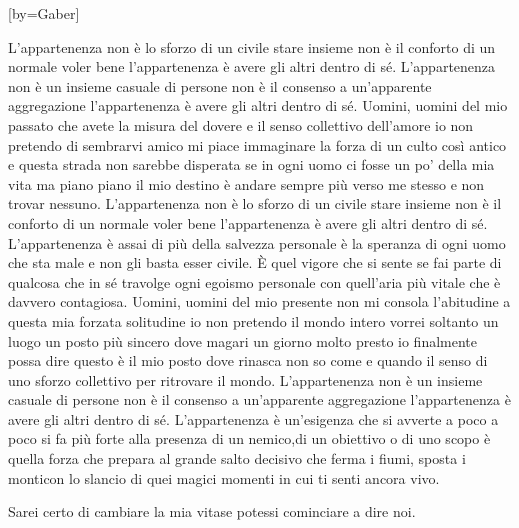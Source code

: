 [by={Gaber}]
\chordsoff
\beginverse*
\rule{0pt}{13pt}L'appartenenza non è lo sforzo \brk di un civile stare insieme
non è il conforto di un normale voler bene
l'appartenenza è avere gli altri dentro di sé.
\endverse
\beginverse*
L'appartenenza \brk  non è un insieme casuale di persone
non è il consenso a un'apparente aggregazione
l'appartenenza è avere gli altri dentro di sé.
\endverse
\beginverse*
Uomini, uomini del mio passato
che avete la misura del dovere
e il senso collettivo dell'amore
io non pretendo di sembrarvi amico
mi piace immaginare
la forza di un culto così antico
e questa strada non sarebbe disperata
se in ogni uomo ci fosse un po' della mia vita
ma piano piano il mio destino
è andare sempre più verso me stesso
e non trovar nessuno.
\endverse
\beginverse*
L'appartenenza non è lo sforzo \brk  di un civile stare insieme
non è il conforto di un normale voler bene
l'appartenenza è avere gli altri dentro di sé.
\endverse
\beginverse*
L'appartenenza è assai di più \brk  della salvezza personale
è la speranza di ogni uomo che sta male
e non gli basta esser civile.
È quel vigore che si sente \brk  se fai parte di qualcosa
che in sé travolge ogni egoismo personale
con quell'aria più vitale \brk  che è davvero contagiosa.
\endverse
\beginverse*
Uomini, uomini del mio presente
non mi consola l'abitudine
a questa mia forzata solitudine
io non pretendo il mondo intero
vorrei soltanto un luogo un posto più sincero
dove magari un giorno molto presto
io finalmente possa dire questo è il mio posto
dove rinasca non so come e quando
il senso di uno sforzo collettivo \brk  per ritrovare il mondo.
\endverse
\beginverse*
L'appartenenza \brk  non è un insieme casuale di persone
non è il consenso a un'apparente aggregazione
l'appartenenza è avere gli altri dentro di sé.
\endverse
\beginverse*
L'appartenenza è un'esigenza \brk  che si avverte a poco a poco
si fa più forte alla presenza di un nemico,\brk di un obiettivo o di uno scopo
è quella forza che prepara \brk  al grande salto decisivo
che ferma i fiumi, sposta i monti\brk con lo slancio di quei magici momenti
in cui ti senti ancora vivo.

Sarei certo di cambiare la mia vita\brk se potessi cominciare a dire noi.
\endverse
\endsong

\sclearpage
